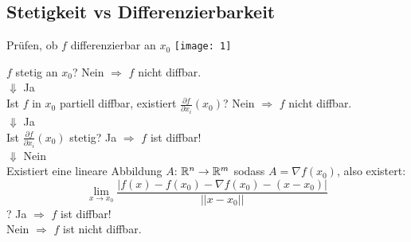 \subsection{Stetigkeit vs Differenzierbarkeit}


\begin{Rezept}{Prüfen, ob $f$ differenzierbar an $x_0$}{}
    \texttt{[image: 1]}
    
    $f$ stetig an $x_0$? Nein $\Rightarrow$ $f$ nicht diffbar.\\
	$\Downarrow$ Ja\\
	Ist $f$ in $x_0$ partiell diffbar, existiert $\frac{\partial f}{\partial x_i}(x_0)$? Nein $\Rightarrow$ $f$ nicht diffbar.\\
	$\Downarrow$ Ja\\
	Ist $\frac{\partial f}{\partial x_i}(x_0)$ stetig? Ja $\Rightarrow$ $f$ ist diffbar!\\
	$\Downarrow$ Nein\\
	Existiert eine lineare Abbildung $A$: $\mathbb{R}^n \rightarrow \mathbb{R}^m$ sodass $A=\nabla f(x_0)$, also existert:
	\[
    	\lim_{x\rightarrow x_0} \frac{|f(x)-f(x_0)-\nabla f(x_0) - (x-x_0)|}{||x-x_0||}
	\]?
	Ja $\Rightarrow$ $f$ ist diffbar!\\
	Nein $\Rightarrow$ $f$ ist nicht diffbar.
\end{Rezept}
